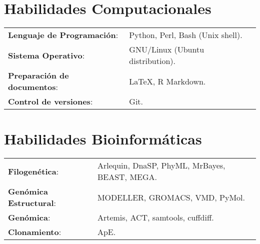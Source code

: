 \documentclass[margin,line]{res}
\begin{document}
\begin{resume}
\section{\sc Habilidades Computacionales}
\begin{tabular}{ l l}
	{\bf Lenguaje de Programación}: & Python, Perl, Bash (Unix shell).\\
	{\bf Sistema Operativo}: & GNU/Linux (Ubuntu distribution).\\ %
	{\bf Preparación de documentos}: & \LaTeX, R Markdown.\\ %
	{\bf Control de versiones}: & Git.%
\end{tabular}

\section{\sc Habilidades Bioinformáticas}
\begin{tabular}{l l}
	{\bf Filogenética}: & Arlequin, DnaSP, PhyML, MrBayes, BEAST, MEGA.\\
	{\bf Genómica Estructural}: & MODELLER, GROMACS, VMD, PyMol.\\
	{\bf Genómica}: & Artemis, ACT, samtools, cuffdiff.\\
	{\bf Clonamiento}: & ApE.%
\end{tabular}



\end{resume}
\end{document}
